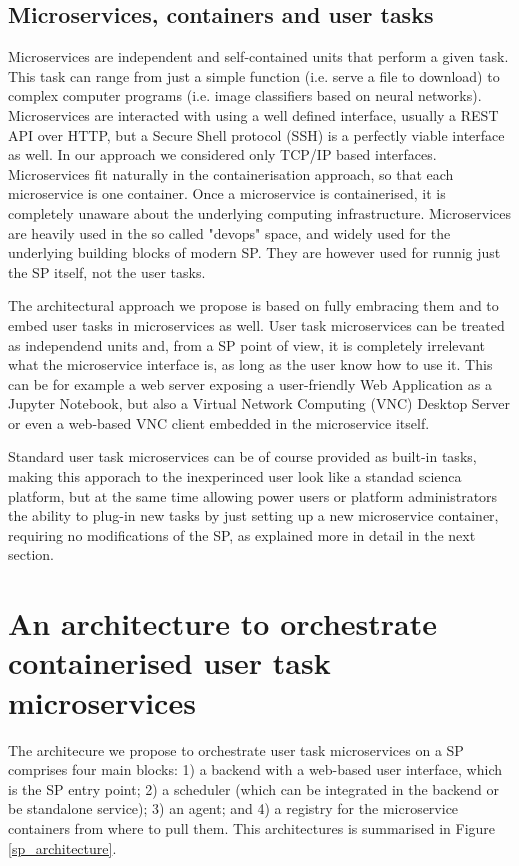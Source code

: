 \documentclass[11pt,twoside]{article}
\begin{document}
\subsection{Microservices, containers  and user tasks}
Microservices are independent and self-contained units that perform a given task. This task can range from just a simple function (i.e. serve a file to download) to complex computer programs (i.e. image classifiers based on neural networks). Microservices are interacted with using a well defined interface, usually a REST API over HTTP, but a Secure Shell protocol (SSH) is a perfectly viable interface as well. In our approach we considered only TCP/IP based interfaces. Microservices fit naturally in the containerisation approach, so that each microservice is one container. Once a microservice is containerised, it is completely unaware about the underlying computing infrastructure. %
Microservices are heavily used in the so called "devops" space, and widely used for the underlying building blocks of modern SP. They are however used for runnig just the SP itself, not the user tasks.

The architectural approach we propose is based on fully embracing them and to embed user tasks in microservices as well. User task microservices can be treated as independend units and, from a SP point of view, it is completely irrelevant what the microservice interface is, as long as the user know how to use it. This can be for example a web server exposing a user-friendly Web Application as a Jupyter Notebook, but also a Virtual Network Computing (VNC) Desktop Server or even a web-based VNC client embedded in the microservice itself. 

Standard user task microservices can be of course provided as built-in tasks, making this apporach to the inexperinced user look like a standad scienca platform, but at the same time allowing power users or platform administrators the ability to plug-in new tasks by just setting up a new microservice container, requiring no modifications of the SP, as explained more in detail in the next section.



\section{An architecture to orchestrate containerised user task microservices}
The architecure we propose to orchestrate user task microservices on a SP comprises four main blocks: 1) a backend with a web-based user interface, which is the SP entry point; 2) a scheduler (which can be integrated in the backend or be standalone service); 3) an agent; and 4) a registry for the microservice containers from where to pull them. This architectures is summarised in Figure \ref{sp_architecture}.
\end{document}
